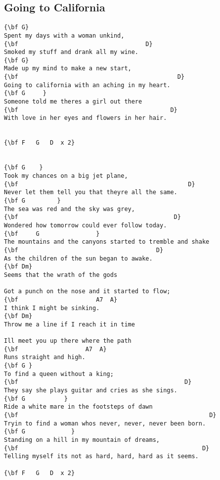 \documentclass[a4paper]{article}
\begin{document}
\subsection{Going to California} %
\label{sub:Going to Californi}
\begin{Verbatim}[commandchars=\\\{\}]
{\bf G}
Spent my days with a woman unkind,
{\bf                                    D}
Smoked my stuff and drank all my wine.
{\bf G}
Made up my mind to make a new start,
{\bf                                             D}
Going to california with an aching in my heart.
{\bf G     }
Someone told me theres a girl out there
{\bf                                           D}
With love in her eyes and flowers in her hair.


{\bf F   G   D  x 2}


{\bf G    }
Took my chances on a big jet plane,
{\bf                                                D}
Never let them tell you that theyre all the same.
{\bf G         }
The sea was red and the sky was grey,
{\bf                                            D}
Wondered how tomorrow could ever follow today.
{\bf     G                }
The mountains and the canyons started to tremble and shake
{\bf                                       D}
As the children of the sun began to awake.
{\bf Dm}
Seems that the wrath of the gods

Got a punch on the nose and it started to flow;
{\bf                      A7  A}
I think I might be sinking.
{\bf Dm}
Throw me a line if I reach it in time

Ill meet you up there where the path
{\bf                   A7  A}
Runs straight and high.
{\bf G }
To find a queen without a king;
{\bf                                               D}
They say she plays guitar and cries as she sings.
{\bf G           }
Ride a white mare in the footsteps of dawn
{\bf                                                      D}
Tryin to find a woman whos never, never, never been born.
{\bf G             }
Standing on a hill in my mountain of dreams,
{\bf                                                    D}
Telling myself its not as hard, hard, hard as it seems.

{\bf F   G   D  x 2}
\end{Verbatim}
\newpage
\end{document}
